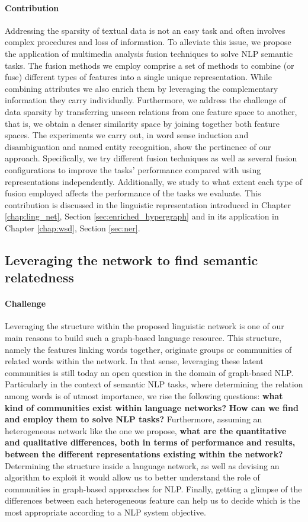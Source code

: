 \paragraph{Contribution}
Addressing the sparsity of textual data is not an easy task and often involves complex procedures and loss of information. To alleviate this issue, we propose the application of multimedia analysis fusion techniques to solve NLP semantic tasks. The fusion methods we employ comprise a set of methods to combine (or fuse) different types of features into a single unique representation. While combining attributes we also enrich them by leveraging the complementary information  they carry individually. Furthermore, we address the challenge of data sparsity by transferring unseen relations from one feature space to another, that is, we obtain a denser similarity space by joining together both feature spaces. The experiments we carry out, in word sense induction and disambiguation and named entity recognition, show the pertinence of our approach. Specifically, we try different fusion techniques as well as several fusion configurations to improve the tasks' performance compared with using representations independently. Additionally, we study to what extent each type of fusion employed affects the performance of the tasks we evaluate. This contribution is discussed in the linguistic representation introduced in Chapter \ref{chap:ling_net}, Section \ref{sec:enriched_hypergraph} and in its application in Chapter \ref{chap:wsd},  Section \ref{sec:ner}.





\subsection{Leveraging the network to find semantic relatedness}
\paragraph{Challenge}
Leveraging the structure within the proposed linguistic network is one of our main reasons to build such a graph-based language resource. This structure, namely the features linking words  together, originate groups or communities of related words within the network. In that sense, leveraging these latent communities is still today an open question in the domain of graph-based NLP. Particularly in the context of semantic NLP tasks, where determining the relation among words is of utmost importance, we rise the following questions: \textbf{what kind of communities exist within language networks?} \textbf{How can we find and employ them to solve NLP tasks?} Furthermore, assuming an heterogeneous network like the one we propose, \textbf{what are the quantitative and qualitative differences, both in terms of performance and results, between the different representations existing within the network?} Determining the structure inside a language network, as well as devising an algorithm to exploit it would allow us to better understand the role of communities in  graph-based approaches for NLP. Finally, getting a glimpse of the differences between each heterogeneous feature can help us to decide which is the most appropriate according to a NLP system objective. 


